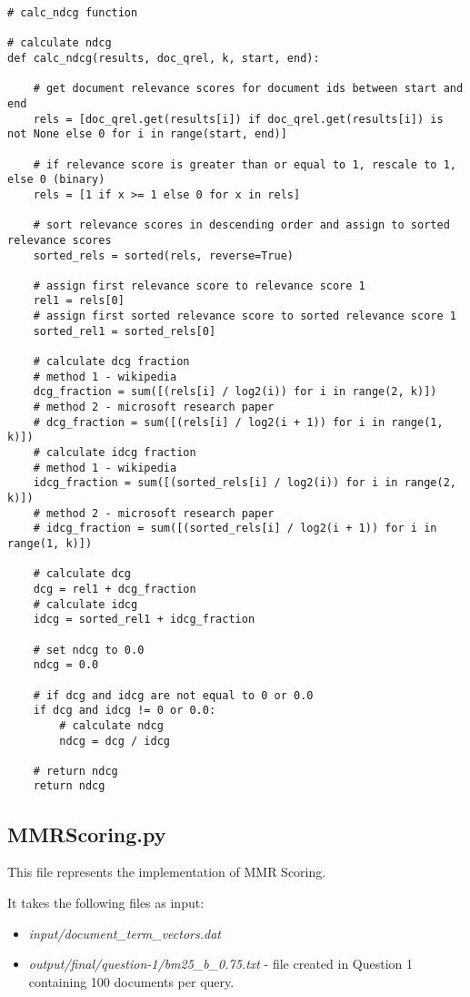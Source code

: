 \documentclass{article} %
\begin{document}
\begin{lstlisting}[style=Python]
# calc_ndcg function

# calculate ndcg
def calc_ndcg(results, doc_qrel, k, start, end):

    # get document relevance scores for document ids between start and end
    rels = [doc_qrel.get(results[i]) if doc_qrel.get(results[i]) is not None else 0 for i in range(start, end)]

    # if relevance score is greater than or equal to 1, rescale to 1, else 0 (binary)
    rels = [1 if x >= 1 else 0 for x in rels]

    # sort relevance scores in descending order and assign to sorted relevance scores
    sorted_rels = sorted(rels, reverse=True)

    # assign first relevance score to relevance score 1
    rel1 = rels[0]
    # assign first sorted relevance score to sorted relevance score 1
    sorted_rel1 = sorted_rels[0]

    # calculate dcg fraction
    # method 1 - wikipedia
    dcg_fraction = sum([(rels[i] / log2(i)) for i in range(2, k)])
    # method 2 - microsoft research paper
    # dcg_fraction = sum([(rels[i] / log2(i + 1)) for i in range(1, k)])
    # calculate idcg fraction
    # method 1 - wikipedia
    idcg_fraction = sum([(sorted_rels[i] / log2(i)) for i in range(2, k)])
    # method 2 - microsoft research paper
    # idcg_fraction = sum([(sorted_rels[i] / log2(i + 1)) for i in range(1, k)])

    # calculate dcg
    dcg = rel1 + dcg_fraction
    # calculate idcg
    idcg = sorted_rel1 + idcg_fraction

    # set ndcg to 0.0
    ndcg = 0.0

    # if dcg and idcg are not equal to 0 or 0.0
    if dcg and idcg != 0 or 0.0:
        # calculate ndcg
        ndcg = dcg / idcg

    # return ndcg
    return ndcg
\end{lstlisting}

\subsection*{MMRScoring.py \cite{carbonell1998use}}

This file represents the implementation of MMR Scoring.

It takes the following files as input:

\begin{itemize}
    \item \textit{input/document\_term\_vectors.dat}
    \item \textit{output/final/question-1/bm25\_b\_0.75.txt} - file created in Question 1 containing 100 documents per query.
\end{itemize}
\end{document}
